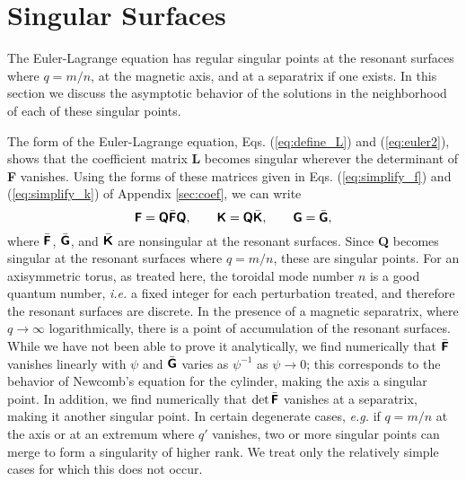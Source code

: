 \documentclass[prb,twocolumn,showpacs,preprintnumbers,amsmath,amssymb]{revtex4}
\renewcommand*{\t}[1]{\hbox{\sffamily\bfseries #1}}
\begin{document}
\section{\label{sec:sing}Singular Surfaces}

The Euler-Lagrange equation has regular singular points at the resonant
surfaces where $q=m/n$, at the magnetic axis, and at a separatrix if one
exists.  In this section we discuss the asymptotic behavior of the
solutions in the neighborhood of each of these singular points.

The form of the Euler-Lagrange equation, Eqs. (\ref{eq:define_L}) and
(\ref{eq:euler2}), shows that the coefficient matrix \t{L} becomes
singular wherever the determinant of \t{F} vanishes.  Using the forms of
these matrices given in Eqs. (\ref{eq:simplify_f}) and
(\ref{eq:simplify_k}) of Appendix \ref{sec:coef}, we can write
\[
\t{F} = \t{Q} \bar{\t{F}} \t{Q}, \qquad 
\t{K} = \t{Q} \bar{\t{K}}, \qquad
\t{G} = \bar{\t{G}},
\]
where $\bar{\t{F}}$, $\bar{\t{G}}$, and $\bar{\t{K}}$ are nonsingular at
the resonant surfaces.  Since \t{Q} becomes singular at the resonant
surfaces where $q=m/n$, these are singular points.  For an axisymmetric
torus, as treated here, the toroidal mode number $n$ is a good quantum
number, {\it i.e.} a fixed integer for each perturbation treated, and
therefore the resonant surfaces are discrete.  In the presence of a
magnetic separatrix, where $q \to \infty$ logarithmically, there is a
point of accumulation of the resonant surfaces.  While we have not been
able to prove it analytically, we find numerically that $\bar{\t{F}}$
vanishes linearly with $\psi$ and $\bar{\t{G}}$ varies as $\psi^{-1}$ as
$\psi \to 0$; this corresponds to the behavior of Newcomb's equation for
the cylinder, making the axis a singular point.  In addition, we find
numerically that $\det \bar{\t{F}}$ vanishes at a separatrix, making it
another singular point.  In certain degenerate cases, {\it e.g.} if $q =
m/n$ at the axis or at an extremum where $q'$ vanishes, two or more
singular points can merge to form a singularity of higher rank.  We
treat only the relatively simple cases for which this does not occur.
\end{document}
